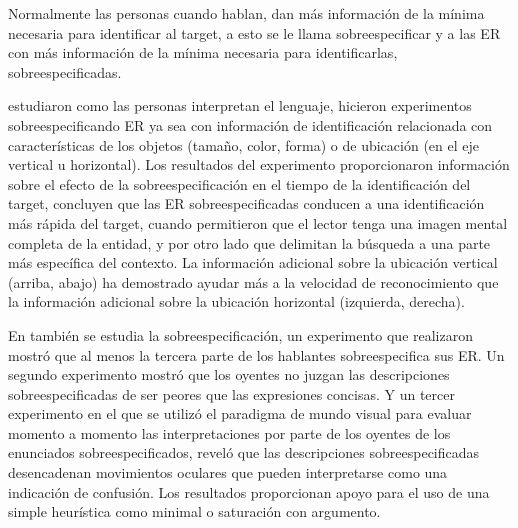
Normalmente las personas cuando hablan, dan m\'as informaci\'on de la m\'inima necesaria para identificar al target, a esto se le llama sobreespecificar y a las ER con m\'as informaci\'on de la m\'inima necesaria para identificarlas, sobreespecificadas. 

\cite{arts} estudiaron como las personas interpretan el lenguaje, 
hicieron experimentos sobreespecificando ER ya sea con informaci\'on de identificaci\'on relacionada con caracter\'isticas de los objetos (tama\~no, color, forma) o de ubicaci\'on (en el eje vertical u horizontal). Los resultados del experimento
proporcionaron informaci\'on sobre el efecto de la sobreespecificaci\'on en el tiempo de la identificaci\'on del target,
concluyen que las ER sobreespecificadas conducen a una identificaci\'on m\'as r\'apida del target, cuando permitieron que el lector 
tenga una imagen mental completa de la entidad, y por otro lado que delimitan la b\'usqueda a una parte m\'as espec\'ifica
del contexto. La informaci\'on adicional sobre la ubicaci\'on vertical (arriba, abajo) ha demostrado ayudar m\'as a la velocidad de reconocimiento que la informaci\'on adicional sobre la ubicaci\'on horizontal (izquierda, derecha).

En \cite{do-speakers} tambi\'en se estudia la sobreespecificaci\'on, un experimento que realizaron mostr\'o que al menos la tercera parte de los hablantes sobreespecifica sus ER. Un segundo experimento mostr\'o que los oyentes no juzgan las descripciones sobreespecificadas de ser peores que las expresiones concisas. Y un tercer experimento en el que se utiliz\'o el paradigma de mundo visual para evaluar momento a momento las interpretaciones por parte de los oyentes de los enunciados sobreespecificados, revel\'o que las descripciones sobreespecificadas desencadenan movimientos oculares que pueden interpretarse como una indicaci\'on de confusi\'on. Los resultados proporcionan apoyo para el uso de una simple heur\'istica como minimal o saturaci\'on con argumento.


